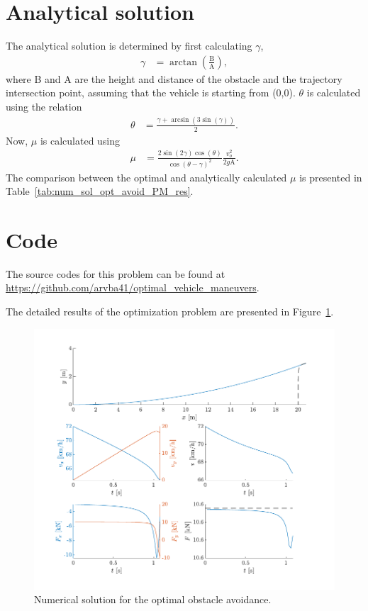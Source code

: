 \section{Analytical solution}
The analytical solution is determined by first calculating $\gamma$, 
\begin{align}
    \gamma &= \arctan\left(\frac{\text{B}}{\text{A}}\right),
\end{align}
where B and A are the height and distance of the obstacle and the trajectory intersection point, assuming that the vehicle is starting from (0,0). 
$\theta$ is calculated using the relation
\begin{align}
    \theta &= \frac{\gamma + \arcsin\left(3\sin\left(\gamma\right)\right)}{2}.
\end{align}
Now, $\mu$ is calculated using 
\begin{align}
    \mu &= \frac{2\sin\left(2\gamma\right)\cos\left(\theta\right)}{\cos\left(\theta-\gamma\right)^2}\frac{v_o^2}{2g\text{A}}.
\end{align}
The comparison between the optimal and analytically calculated $\mu$ is presented in Table~\ref{tab:num_sol_opt_avoid_PM_res}.

\section{Code}
The source codes for this problem can be found at \newline \href{https://github.com/arvba41/optimal_vehicle_maneuvers/tree/main/uppgift/ugf2}{https://github.com/arvba41/optimal\_vehicle\_maneuvers}.

The detailed results of the optimization problem are presented in Figure~\ref{fig:num_sol_opt_avoid_PM_res_pic}.
\begin{figure}[h!]
    \centering
    \includegraphics{figures/prob4_opt_avoid_path.pdf}
    \caption{Numerical solution for the optimal obstacle avoidance.}
    \label{fig:num_sol_opt_avoid_PM_res_pic}
\end{figure}
